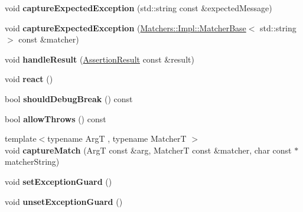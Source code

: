 \begin{DoxyCompactItemize}
\item 
void {\bfseries capture\+Expected\+Exception} (std\+::string const \&expected\+Message)\hypertarget{classCatch_1_1ResultBuilder_a9ac96f6220c8dd8e4feee725c6228d77}{}\label{classCatch_1_1ResultBuilder_a9ac96f6220c8dd8e4feee725c6228d77}

\item 
void {\bfseries capture\+Expected\+Exception} (\hyperlink{structCatch_1_1Matchers_1_1Impl_1_1MatcherBase}{Matchers\+::\+Impl\+::\+Matcher\+Base}$<$ std\+::string $>$ const \&matcher)\hypertarget{classCatch_1_1ResultBuilder_a2d6a194258f07f212fef098c0201038a}{}\label{classCatch_1_1ResultBuilder_a2d6a194258f07f212fef098c0201038a}

\item 
void {\bfseries handle\+Result} (\hyperlink{classCatch_1_1AssertionResult}{Assertion\+Result} const \&result)\hypertarget{classCatch_1_1ResultBuilder_ad8bb17e4ac590b75bf8630d8f3502f4e}{}\label{classCatch_1_1ResultBuilder_ad8bb17e4ac590b75bf8630d8f3502f4e}

\item 
void {\bfseries react} ()\hypertarget{classCatch_1_1ResultBuilder_a3085cdc46533d45bed6f652a2ac295c0}{}\label{classCatch_1_1ResultBuilder_a3085cdc46533d45bed6f652a2ac295c0}

\item 
bool {\bfseries should\+Debug\+Break} () const \hypertarget{classCatch_1_1ResultBuilder_a34cdbf7ad1e5b3cb4a94047f2d14bcb2}{}\label{classCatch_1_1ResultBuilder_a34cdbf7ad1e5b3cb4a94047f2d14bcb2}

\item 
bool {\bfseries allow\+Throws} () const \hypertarget{classCatch_1_1ResultBuilder_a3dbf18a3a4b00173dab052a8864e435e}{}\label{classCatch_1_1ResultBuilder_a3dbf18a3a4b00173dab052a8864e435e}

\item 
{\footnotesize template$<$typename ArgT , typename MatcherT $>$ }\\void {\bfseries capture\+Match} (ArgT const \&arg, MatcherT const \&matcher, char const $\ast$matcher\+String)\hypertarget{classCatch_1_1ResultBuilder_a27425538bec8fee7ac69403c5df6078c}{}\label{classCatch_1_1ResultBuilder_a27425538bec8fee7ac69403c5df6078c}

\item 
void {\bfseries set\+Exception\+Guard} ()\hypertarget{classCatch_1_1ResultBuilder_a87929808b4ec9b6cb5838edc1f27df17}{}\label{classCatch_1_1ResultBuilder_a87929808b4ec9b6cb5838edc1f27df17}

\item 
void {\bfseries unset\+Exception\+Guard} ()\hypertarget{classCatch_1_1ResultBuilder_a0990e93c1e13f96ffe02fa0f45e8f155}{}\label{classCatch_1_1ResultBuilder_a0990e93c1e13f96ffe02fa0f45e8f155}

\end{DoxyCompactItemize}


